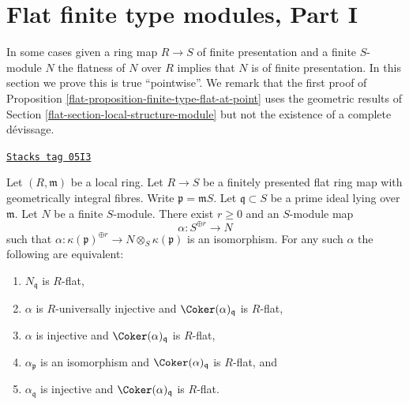 \section{Flat finite type modules, Part I}
\label{flat-section-finite-type-flat-I}
In some cases given a ring map $R \to S$ of finite presentation and
a finite $S$-module $N$ the flatness of $N$ over $R$ implies that $N$
is of finite presentation. In this section we prove this is true
``pointwise''. We remark that the first proof of
Proposition \ref{flat-proposition-finite-type-flat-at-point}
uses the geometric results of
Section \ref{flat-section-local-structure-module}
but not the existence of a complete d\'evissage.

\begin{lemma}
\label{flat-lemma-induction-step}
\href{https://stacks.math.columbia.edu/tag/05I3}{\texttt{Stacks tag 05I3}}

Let $(R, \mathfrak m)$ be a local ring. Let $R \to S$ be a finitely presented
flat ring map with geometrically integral fibres. Write
$\mathfrak p = \mathfrak mS$. Let $\mathfrak q \subset S$ be a prime ideal
lying over $\mathfrak m$. Let $N$ be a finite $S$-module.
There exist $r \geq 0$ and an $S$-module map
$$
\alpha : S^{\oplus r} \longrightarrow N
$$
such that
$\alpha : \kappa(\mathfrak p)^{\oplus r} \to N \otimes_S \kappa(\mathfrak p)$
is an isomorphism. For any such $\alpha$ the following are equivalent:
\begin{enumerate}
\item $N_{\mathfrak q}$ is $R$-flat,
\item $\alpha$ is $R$-universally injective and
$\Coker(\alpha)_{\mathfrak q}$ is $R$-flat,
\item $\alpha$ is injective and
$\Coker(\alpha)_{\mathfrak q}$ is $R$-flat,
\item $\alpha_{\mathfrak p}$ is an isomorphism and
$\Coker(\alpha)_{\mathfrak q}$ is $R$-flat, and
\item $\alpha_{\mathfrak q}$ is injective and
$\Coker(\alpha)_{\mathfrak q}$ is $R$-flat.
\end{enumerate}
\end{lemma}

